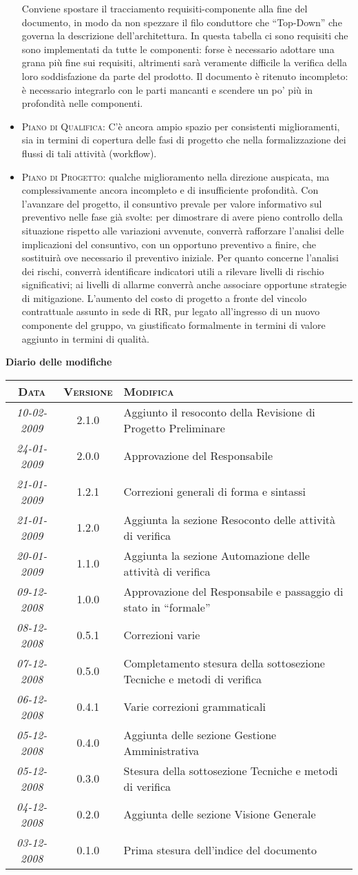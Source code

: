 \documentclass[11pt,a4paper]{article}
\newcommand{\modifiche} 
{
\newpage
\begin{center}
\textbf{Diario delle modifiche} \\
\bigskip
\begin{tabular}{|c|c|p{0.61\textwidth}|}
\hline
\textsc{Data} & \textsc{Versione} & \textsc{Modifica} \\
\hline
\hline
\textit{10-02-2009} & 2.1.0 & Aggiunto il resoconto della Revisione di Progetto Preliminare  \\
\hline
\textit{24-01-2009} & 2.0.0 & Approvazione del Responsabile  \\
\hline
\textit{21-01-2009} & 1.2.1 & Correzioni generali di forma e sintassi  \\
\hline
\textit{21-01-2009} & 1.2.0 & Aggiunta la sezione Resoconto delle attività di verifica  \\
\hline
\textit{20-01-2009} & 1.1.0 & Aggiunta la sezione Automazione delle attività di verifica  \\
\hline
\textit{09-12-2008} & 1.0.0 & Approvazione del Responsabile e passaggio di stato in ``formale''  \\
\hline
\textit{08-12-2008} & 0.5.1 & Correzioni varie  \\
\hline
\textit{07-12-2008} & 0.5.0 & Completamento stesura della sottosezione Tecniche e metodi di verifica  \\
\hline
\textit{06-12-2008} & 0.4.1 & Varie correzioni grammaticali  \\
\hline
\textit{05-12-2008} & 0.4.0 & Aggiunta delle sezione Gestione Amministrativa  \\
\hline
\textit{05-12-2008} & 0.3.0 & Stesura della sottosezione Tecniche e metodi di verifica  \\
\hline
\textit{04-12-2008} & 0.2.0 & Aggiunta delle sezione Visione Generale  \\
\hline
\textit{03-12-2008} & 0.1.0 & Prima stesura dell'indice del documento \\
\hline
\end{tabular}
\end{center}
}
\begin{document}
\begin{itemize}
Conviene spostare il tracciamento requisiti-componente alla fine del documento, in modo da non spezzare il filo conduttore che “Top-Down” che governa la descrizione dell'architettura. In questa tabella ci sono requisiti che sono implementati da tutte le componenti: forse è necessario adottare una grana più fine sui requisiti, altrimenti sarà veramente difficile la verifica della loro soddisfazione da parte del prodotto.
Il documento è ritenuto incompleto: è necessario integrarlo con le parti mancanti e scendere un po' più in profondità nelle componenti.
\item \textsc{Piano di Qualifica:} C'è ancora ampio spazio per consistenti miglioramenti, sia in termini di copertura delle fasi di progetto che nella formalizzazione dei flussi di tali attività (workflow).
\item \textsc{Piano di Progetto:} qualche miglioramento nella direzione auspicata, ma complessivamente ancora incompleto e di insufficiente profondità.
Con l'avanzare del progetto, il consuntivo prevale per valore informativo sul preventivo nelle fase già svolte: per dimostrare di avere pieno controllo della situazione rispetto alle variazioni avvenute, converrà rafforzare l'analisi delle implicazioni del consuntivo, con un opportuno preventivo a finire, che sostituirà ove necessario il preventivo iniziale.
Per quanto concerne l'analisi dei rischi, converrà identificare indicatori utili a rilevare livelli di rischio significativi; ai livelli di allarme converrà anche associare opportune strategie di mitigazione.
L'aumento del costo di progetto a fronte del vincolo contrattuale assunto in sede di RR, pur legato all'ingresso di un nuovo componente del gruppo, va giustificato formalmente in termini di valore aggiunto in termini di qualità.
\end{itemize}
\modifiche
\end{document}
